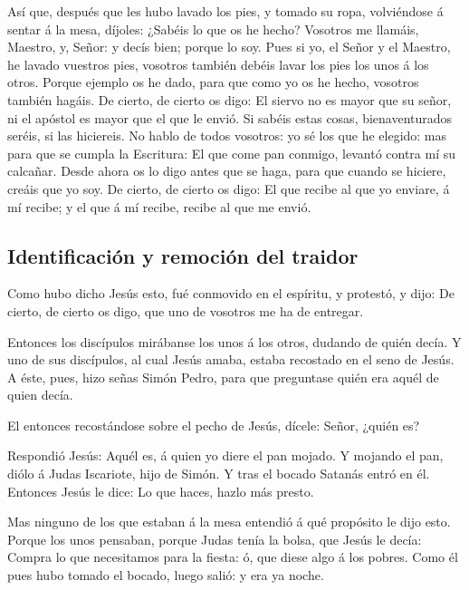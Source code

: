  Así que, después que les hubo lavado los pies, y tomado su
ropa, volviéndose á sentar á la mesa, díjoles: ¿Sabéis lo que os he
hecho?  Vosotros me llamáis, Maestro, y, Señor: y decís
bien; porque lo soy.  Pues si yo, el Señor y el Maestro, he
lavado vuestros pies, vosotros también debéis lavar los pies los unos á
los otros.  Porque ejemplo os he dado, para que como yo os
he hecho, vosotros también hagáis.  De cierto, de cierto os
digo: El siervo no es mayor que su señor, ni el apóstol es mayor que el
que le envió.  Si sabéis estas cosas, bienaventurados
seréis, si las hiciereis.  No hablo de todos vosotros: yo
sé los que he elegido: mas para que se cumpla la Escritura: El que come
pan conmigo, levantó contra mí su calcañar.  Desde ahora os
lo digo antes que se haga, para que cuando se hiciere, creáis que yo
soy.  De cierto, de cierto os digo: El que recibe al que yo
enviare, á mí recibe; y el que á mí recibe, recibe al que me envió.

\hypertarget{identificaciuxf3n-y-remociuxf3n-del-traidor}{%
\subsection{Identificación y remoción del
traidor}\label{identificaciuxf3n-y-remociuxf3n-del-traidor}}

 Como hubo dicho Jesús esto, fué conmovido en el espíritu,
y protestó, y dijo: De cierto, de cierto os digo, que uno de vosotros me
ha de entregar.

 Entonces los discípulos mirábanse los unos á los otros,
dudando de quién decía.  Y uno de sus discípulos, al cual
Jesús amaba, estaba recostado en el seno de Jesús.  A éste,
pues, hizo señas Simón Pedro, para que preguntase quién era aquél de
quien decía.

 El entonces recostándose sobre el pecho de Jesús, dícele:
Señor, ¿quién es?

 Respondió Jesús: Aquél es, á quien yo diere el pan mojado.
Y mojando el pan, diólo á Judas Iscariote, hijo de Simón. 
Y tras el bocado Satanás entró en él. Entonces Jesús le dice: Lo que
haces, hazlo más presto.

 Mas ninguno de los que estaban á la mesa entendió á qué
propósito le dijo esto.  Porque los unos pensaban, porque
Judas tenía la bolsa, que Jesús le decía: Compra lo que necesitamos para
la fiesta: ó, que diese algo á los pobres.  Como él pues
hubo tomado el bocado, luego salió: y era ya noche.


